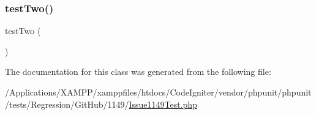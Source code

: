 \mbox{\label{class_issue1149_test_a4fb9974ce113d5d1db8075e0db0dc9b6}} 
\subsubsection{\texorpdfstring{test\+Two()}{testTwo()}}
{\footnotesize\ttfamily test\+Two (\begin{DoxyParamCaption}{ }\end{DoxyParamCaption})}



The documentation for this class was generated from the following file\+:\begin{DoxyCompactItemize}
\item 
/\+Applications/\+X\+A\+M\+P\+P/xamppfiles/htdocs/\+Code\+Igniter/vendor/phpunit/phpunit/tests/\+Regression/\+Git\+Hub/1149/\mbox{\hyperlink{_issue1149_test_8php}{Issue1149\+Test.\+php}}\end{DoxyCompactItemize}
